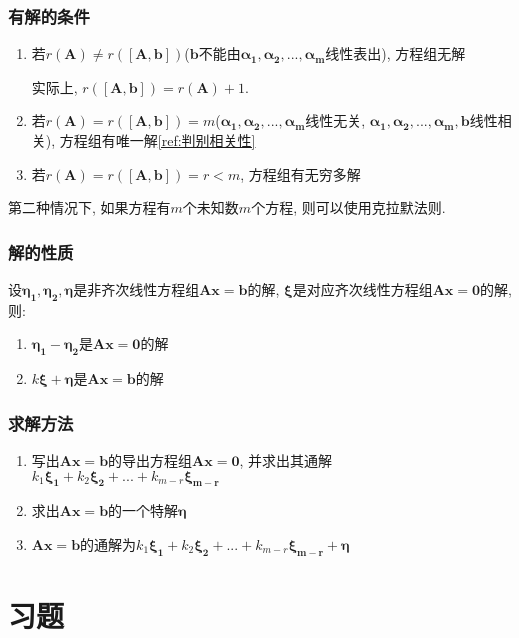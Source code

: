 \subsubsection{有解的条件}\label{非齐次方程组有解的条件}
\begin{enumerate}
\item 若$ r(\bm{A})\neq r([\bm{A},\bm{b}]) $($ \bm{b} $不能由$ \bm{\alpha_{1}},\bm{\alpha_{2}},...,\bm{\alpha_{m}} $线性表出), 方程组无解 \par
实际上, $ r([\bm{A},\bm{b}]) = r(\bm{A}) + 1 $.
\item 若$ r(\bm{A})=r([\bm{A},\bm{b}])=m $($ \bm{\alpha_{1}},\bm{\alpha_{2}},...,\bm{\alpha_{m}} $线性无关, $ \bm{\alpha_{1}},\bm{\alpha_{2}},...,\bm{\alpha_{m}},\bm{b} $线性相关), 方程组有唯一解\ref{ref:判别相关性}
\item 若$ r(\bm{A})=r([\bm{A},\bm{b}])=r<m $, 方程组有无穷多解
\end{enumerate}\par
第二种情况下, 如果方程有$ m $个未知数$ m $个方程, 则可以使用克拉默法则.
\subsubsection{解的性质}
设$ \bm{\eta_{1}},\bm{\eta_{2}},\bm{\eta} $是非齐次线性方程组$ \bm{A}\bm{x}=\bm{b} $的解, $ \bm{\xi} $是对应齐次线性方程组$ \bm{A}\bm{x}=\bm{0} $的解, 则: \label{特殊解相减}
\begin{enumerate}
\item $ \bm{\eta_{1}}-\bm{\eta_{2}} $是$ \bm{A}\bm{x}=\bm{0} $的解
\item $ k\bm{\xi}+\bm{\eta} $是$ \bm{A}\bm{x}=\bm{b} $的解
\end{enumerate}
\subsubsection{求解方法}\label{非齐次线性方程组求解方法}
\begin{enumerate}
\item 写出$ \bm{A}\bm{x}=\bm{b} $的导出方程组$ \bm{A}\bm{x}=\bm{0} $, 并求出其通解$ k_{1}\bm{\xi_{1}}+k_{2}\bm{\xi_{2}}+...+k_{m-r}\bm{\xi_{m-r}} $
\item 求出$ \bm{A}\bm{x}=\bm{b} $的一个特解$ \bm{\eta} $
\item $ \bm{A}\bm{x}=\bm{b} $的通解为$ k_{1}\bm{\xi_{1}}+k_{2}\bm{\xi_{2}}+...+k_{m-r}\bm{\xi_{m-r}}+\bm{\eta} $
\end{enumerate}
\section{习题}
